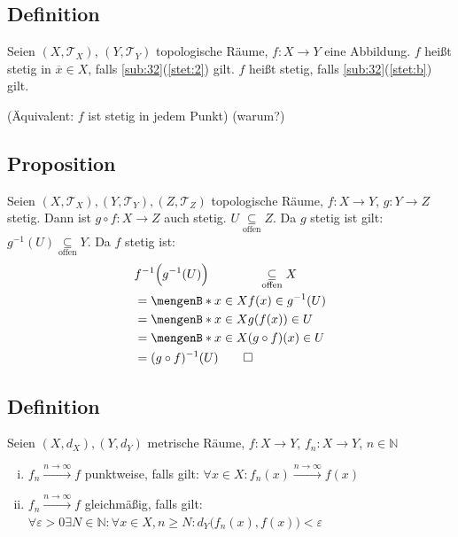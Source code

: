 \subsection[Definition von Stetigkeit in topologischen Räumen]{Definition} %
\label{sub:33}
Seien $(X, \mathcal{T}_X)$, $(Y, \mathcal{T}_Y)$ topologische Räume, $f : X \to Y$ eine Abbildung. $f$ heißt stetig in $\overline{x} \in X$, falls 
\ref{sub:32}(\ref{stet:2}) gilt. $f$ heißt stetig, falls \ref{sub:32}(\ref{stet:b}) gilt. 

(Äquivalent: $f$ ist stetig in jedem Punkt) \hfill (warum?)

\subsection[Proposition über Stetigkeit der Komposition in topologischen Räumen]{Proposition} %
\label{sub:34}
Seien $(X,\mathcal{T}_X), (Y,\mathcal{T}_Y), (Z,\mathcal{T}_Z)$ topologische Räume, $f : X \to Y$, $g : Y \to Z$ stetig. Dann ist $g \circ f : X \to Z$ auch stetig.
$U \underset{\text{offen}}{\subseteq} Z$. Da $g$ stetig ist gilt: $g ^{-1} (U) \underset{\text{offen}}{\subseteq} Y$. Da $f$ stetig ist:
\begin{align*}
	& f ^{-1} \Big(g ^{-1} (U)\Big) \qquad \qquad \underset{\text{offen}}{\subseteq} X \\
	&= \set[x \in X]{f(x) \in g ^{-1} (U)} \\
	&= \set[x \in X]{g(f(x)) \in U} \\  
	&= \set[x \in X]{(g \circ f) (x) \in U} \\
	&= (g \circ f) ^{-1}(U) \tag*{$\square$} 
\end{align*}

\subsection[Definition von punktweiser und gleichmäßiger Konvergenz in metrischen Räumen]{Definition} %
\label{sub:35}
Seien $(X,d_X), (Y,d_Y)$ metrische Räume, $f : X \to Y$, $f_n : X \to Y$, $n \in \mathds{N}$ 
\begin{enumerate}[(i)]
	\item $f_n \xrightarrow{n \to \infty} f$ punktweise, falls gilt: $\forall x \in X : f_n (x) \xrightarrow{n \to \infty} f(x)$
	\item $f_n \xrightarrow{n \to \infty} f$ gleichmäßig, falls gilt: 
	$\forall \varepsilon >0 \exists N \in \mathds{N} : \forall x \in X, n \ge N : d_Y \big(f_n(x), f(x) \big) < \varepsilon$
\end{enumerate}

